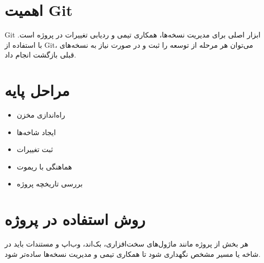 \section{اهمیت Git}

Git ابزار اصلی برای مدیریت نسخه‌ها، همکاری تیمی و ردیابی تغییرات در پروژه است. با استفاده از Git، می‌توان هر مرحله از توسعه را ثبت و در صورت نیاز به نسخه‌های قبلی بازگشت انجام داد.

\section{مراحل پایه}

\begin{itemize}
    \item راه‌اندازی مخزن
    \item ایجاد شاخه‌ها
    \item ثبت تغییرات
    \item هماهنگی با ریموت
    \item بررسی تاریخچه پروژه
\end{itemize}

\section{روش استفاده در پروژه}

هر بخش از پروژه مانند ماژول‌های سخت‌افزاری، بک‌اند، وب‌اپ و مستندات باید در شاخه یا مسیر مشخص نگهداری شود تا همکاری تیمی و مدیریت نسخه‌ها ساده‌تر شود.
